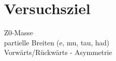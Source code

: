\section{Versuchsziel}
Z0-Masse \\
partielle Breiten (e, mu, tau, had) \\
Vorwärts/Rückwärts - Asymmetrie